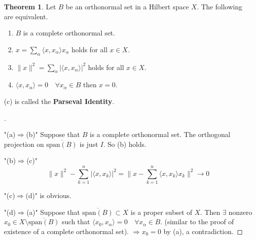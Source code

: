 \documentclass{article}
\theoremstyle{definition}
\newtheorem{thm}{Theorem}
\newenvironment{proofs}[1][\proofname]{%
  \begin{proof}[#1]$ $\par\nobreak\ignorespaces
}{%
  \end{proof}
}
\begin{document}
\begin{thm}
	Let $B$ be an orthonormal set in a Hilbert space $X$.
	The following are equivalent.
	\begin{enumerate}
		\item[(a)] $B$ is a complete orthonormal set.

		\item[(b)] $x = \sum_\alpha \langle x, x_\alpha \rangle x_\alpha$ holds for all $x \in X$.

		\item[(c)] $\|x\|^2 = \sum_\alpha |\langle x, x_\alpha \rangle|^2$ holds for all $x \in X$.

		\item[(d)] $\langle x, x_\alpha \rangle = 0 \quad \forall x_\alpha \in B$ then $x = 0$.
	\end{enumerate}
	(c) is called the \textbf{Parseval Identity}.
\end{thm}

\begin{proofs}
	\par "(a)$\Rightarrow$(b)" Suppose that $B$ is a complete orthonormal set.
	The orthogonal projection on $\overline{\text{span}(B)}$ is just $I$.
	So (b) holds.

	\par "(b)$\Rightarrow$(c)" 
	\[
		\|x\|^2 - \sum_{k = 1}^n |\langle x, x_k \rangle |^2 = \|x - \sum_{k = 1}^n \langle x, x_k \rangle x_k \|^2 \to 0
	\]

	\par "(c)$\Rightarrow$(d)" is obvious.

	\par "(d)$\Rightarrow$(a)" Suppose that $\overline{\text{span}(B)} \subset X$ is a proper subset of $X$.
	Then $\exists$ nonzero $x_0 \in X \setminus \overline{\text{span}(B)}$ such that $\langle x_0, x_\alpha \rangle = 0 \quad \forall x_\alpha \in B$.
	(similar to the proof of existence of a complete orthonormal set).
	$\Rightarrow x_0 = 0$ by (a), a contradiction.
\end{proofs}
\end{document}
